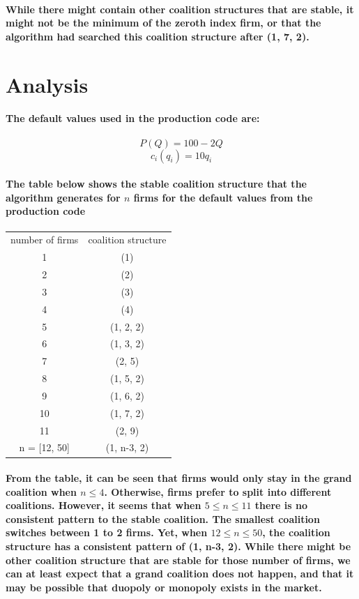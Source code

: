 \documentclass[11pt]{report}
\begin{document}
\paragraph{While there might contain other coalition structures that are stable, it might not be the minimum of the zeroth index firm, or that the algorithm had searched this coalition structure after (1, 7, 2).}

\section{Analysis}
\paragraph{The default values used in the production code are: }

\[P(Q)=100-2Q\]
\[c_i(q_i)=10q_i\]

\paragraph{The table below shows the stable coalition structure that the algorithm generates for $n$ firms for the default values from the production code}
\begin{center}
\begin{tabular}{c c }
  	number of firms & coalition structure \\ 
  	1 & (1)\\ 
  	2 & (2)\\
  	3 & (3)\\ 
  	4 & (4)\\
  	5 & (1, 2, 2)\\
  	6 & (1, 3, 2)\\
  	7 & (2, 5)\\
  	8 & (1, 5, 2)\\
  	9 & (1, 6, 2)\\
  	10 & (1, 7, 2)\\
  	11 & (2, 9)\\
  	n = [12, 50] & (1, n-3, 2)\\ 
\end{tabular}
\end{center}

\paragraph{From the table, it can be seen that firms would only stay in the grand coalition when $n \leq 4$. Otherwise, firms prefer to split into different coalitions. However, it seems that when $5 \leq n \leq  11$ there is no consistent pattern to the stable coalition. The smallest coalition switches between 1 to 2 firms. Yet, when $12 \leq n \leq 50$, the coalition structure has a consistent pattern of (1, n-3, 2). While there might be other coalition structure that are stable for those number of firms, we can at least expect that a grand coalition does not happen, and that it may be possible that duopoly or monopoly exists in the market.}
\end{document}
